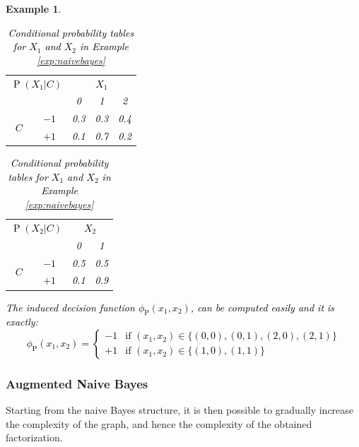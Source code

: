 \documentclass[11pt,a4paper, twoside]{book}
\newtheorem{example}{Example}[chapter]
\newcommand{\Pp}{\operatorname{P}}
\begin{document}
\begin{example}
\begin{table}[h]
\centering
\caption{\textcolor{black}{Conditional probability tables for $X_1$ and $X_2$ in Example \ref{exp:naivebayes}}}
\textcolor{black}{
\begin{subtable}{0.45\textwidth}
\centering
\begin{tabular}{ccccc}
\toprule
\multicolumn{2}{c}{$\Pp(X_1|C)$}        & \multicolumn{3}{c}{$X_1$} \\
   &  &  0  & 1 & 2  \\
     \cmidrule{3-5}
\multirow{2}{0.3cm}{$C$} &     
                       $-1$ &  0.3  &  0.3  & 0.4     \\
                     &  $+1$ &  0.1  &  0.7  & 0.2     \\
\bottomrule
\end{tabular}
\end{subtable}}
\textcolor{black}{
\begin{subtable}{0.45\textwidth}
\centering
\begin{tabular}{cccc}
\toprule
\multicolumn{2}{c}{$\Pp(X_2|C)$}     & \multicolumn{2}{c}{$X_2$} \\
  &  &  0  & 1  \\
     \cmidrule{3-4}
\multirow{2}{0.3cm}{$C$}   
                         &   $-1$ &  0.5  &  0.5       \\
                         &   $+1$ &  0.1  &  0.9      \\
\bottomrule
\end{tabular}
\end{subtable}
}
\label{tab:condexample}
\end{table} 



\textcolor{black}{The induced decision function $\phi_{\Pp}(x_1,x_2)$, can be computed easily and it is exactly:
$$ \phi_{\Pp}(x_1,x_2)=\begin{cases}
                 -1 & \text{if } (x_1,x_2) \in \{ (0,0), (0,1), (2,0), (2,1) \} \\
                 +1 & \text{if } (x_1,x_2) \in \{ (1,0) , (1,1) \} 
\end{cases}
$$}
\end{example}

\subsubsection{Augmented Naive Bayes}

Starting from the naive Bayes structure, it is then possible to gradually increase the complexity of the graph, and hence the complexity of the obtained factorization.
\end{document}
